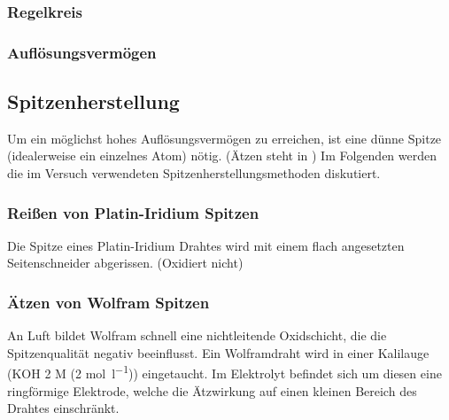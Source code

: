 \documentclass[10pt, a4paper]{article}
\begin{document}
\subsubsection{Regelkreis}
\subsubsection{Auflösungsvermögen}

\subsection{Spitzenherstellung}
Um ein möglichst hohes Auflösungsvermögen zu erreichen, ist eine dünne Spitze (idealerweise ein einzelnes Atom) nötig. (Ätzen steht in \cite{colton})
Im Folgenden werden die im Versuch verwendeten Spitzenherstellungsmethoden diskutiert.

\subsubsection{Reißen von Platin-Iridium Spitzen}
Die Spitze eines Platin-Iridium Drahtes wird mit einem flach angesetzten Seitenschneider abgerissen. (Oxidiert nicht)

\subsubsection{Ätzen von Wolfram Spitzen}
An Luft bildet Wolfram schnell eine nichtleitende Oxidschicht, die die Spitzenqualität negativ beeinflusst.
Ein Wolframdraht wird in einer Kalilauge (KOH 2 M (2 \si{\mol\per\litre})) eingetaucht. Im Elektrolyt befindet sich um diesen eine ringförmige Elektrode, welche die Ätzwirkung auf einen kleinen Bereich des Drahtes einschränkt.
\end{document}
